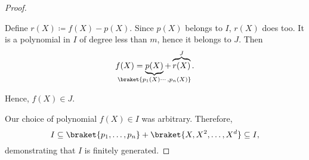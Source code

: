 \begin{proof}
\begin{itemize}
    Define \( r(X) \coloneqq f(X) - p(X) \). Since \( p(X) \) belongs to \( I \), \( r(X) \) does too. It is a polynomial in \( I \) of degree less than \( m \), hence it belongs to \( J \). Then
    \begin{equation*}
      f(X) = \underbrace{ p(X) }_{\mathclap{\braket{ p_1(X) \cdots, p_n(X) }}} + \overbrace{ r(X) }^J.
    \end{equation*}

    Hence, \( f(X) \in J \).
  \end{itemize}

  Our choice of polynomial \( f(X) \in I \) was arbitrary. Therefore,
  \begin{equation*}
    I \subseteq \braket{ p_1, \ldots, p_n } + \braket{ X, X^2, \ldots, X^d } \subseteq I,
  \end{equation*}
  demonstrating that \( I \) is finitely generated.
\end{proof}
